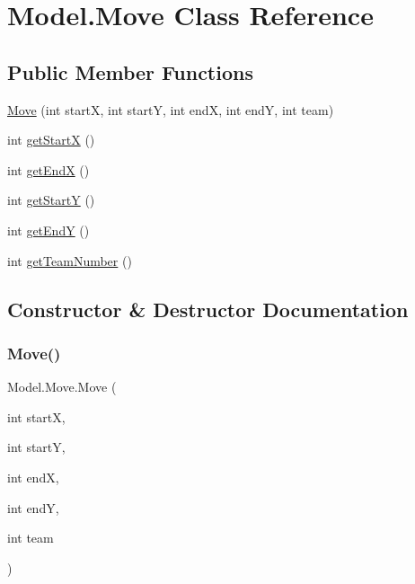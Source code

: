 \hypertarget{class_model_1_1_move}{}\section{Model.\+Move Class Reference}
\label{class_model_1_1_move}
\subsection*{Public Member Functions}
\begin{DoxyCompactItemize}
\item 
\hyperlink{class_model_1_1_move_aab0a02c388b5980cee0e9a2a527504a5}{Move} (int startX, int startY, int endX, int endY, int team)
\item 
int \hyperlink{class_model_1_1_move_ad7b5aacb5a63ce66b88462cb14226511}{get\+StartX} ()
\item 
int \hyperlink{class_model_1_1_move_a28f467365161a5946531359210c8819c}{get\+EndX} ()
\item 
int \hyperlink{class_model_1_1_move_a4bbb121acdea24249ee7ea4466fd8e7a}{get\+StartY} ()
\item 
int \hyperlink{class_model_1_1_move_a35fb048c2ba8223df87a13994d7f37a3}{get\+EndY} ()
\item 
int \hyperlink{class_model_1_1_move_adca5d2e7181293d311eca9062b4f9d1e}{get\+Team\+Number} ()
\end{DoxyCompactItemize}


\subsection{Constructor \& Destructor Documentation}
\hypertarget{class_model_1_1_move_aab0a02c388b5980cee0e9a2a527504a5}{}\label{class_model_1_1_move_aab0a02c388b5980cee0e9a2a527504a5} 
\subsubsection{\texorpdfstring{Move()}{Move()}}
{\footnotesize\ttfamily Model.\+Move.\+Move (\begin{DoxyParamCaption}\item[{int}]{startX,  }\item[{int}]{startY,  }\item[{int}]{endX,  }\item[{int}]{endY,  }\item[{int}]{team }\end{DoxyParamCaption})}

